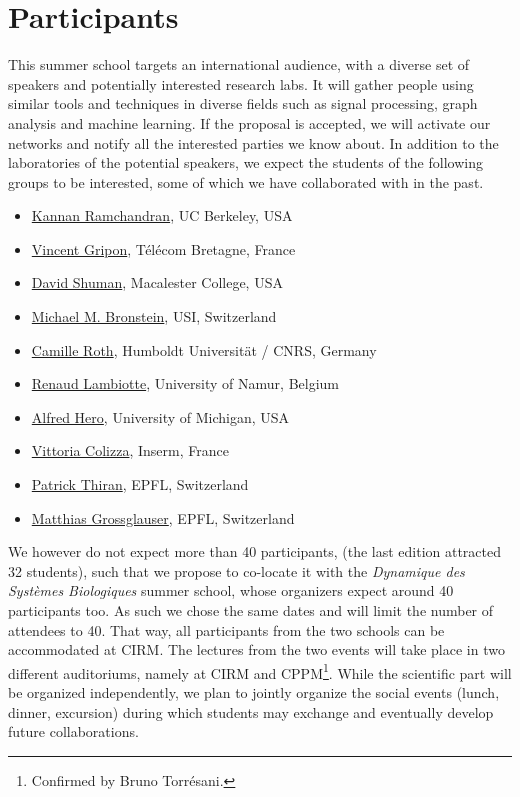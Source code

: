 \documentclass[a4paper]{scrartcl}
\begin{document}
\section{Participants}

This summer school targets an international audience, with a diverse set of
speakers and potentially interested research labs. It will gather people using
similar tools and techniques in diverse fields such as signal processing, graph
analysis and machine learning. If the proposal is accepted, we will activate our
networks and notify all the interested parties we know about. In addition to
the laboratories of the potential speakers, we expect the students of the
following groups to be interested, some of which we have collaborated with in
the past.
\begin{itemize}
	\setlength{\itemsep}{0pt} \setlength{\parskip}{0pt}
	\item \href{http://www.eecs.berkeley.edu/~kannanr/}
		{Kannan Ramchandran}, UC Berkeley, USA
	\item \href{http://www.vincent-gripon.com/}
		{Vincent Gripon}, Télécom Bretagne, France
	\item \href{http://www.macalester.edu/~dshuman1/}
		{David Shuman}, Macalester College, USA
	\item \href{http://www.inf.usi.ch/bronstein/}
		{Michael M. Bronstein}, USI, Switzerland
	\item \href{http://camille.roth.free.fr/index.php}
		{Camille Roth}, Humboldt Universität / CNRS, Germany
	\item \href{http://xn.unamur.be/}
		{Renaud Lambiotte}, University of Namur, Belgium
	\item \href{http://web.eecs.umich.edu/~hero/}
		{Alfred Hero}, University of Michigan, USA
	\item \href{http://www.epicx-lab.com/vittoria-colizza.html}
		{Vittoria Colizza}, Inserm, France
	\item \href{http://people.epfl.ch/patrick.thiran}
		{Patrick Thiran}, EPFL, Switzerland
	\item \href{http://icapeople.epfl.ch/grossglauser/}
		{Matthias Grossglauser}, EPFL, Switzerland
\end{itemize}

We however do not expect more than 40 participants, (the last edition attracted
32 students), such that we propose to co-locate it with the \textit{Dynamique des
Systèmes Biologiques} summer school, whose organizers expect around 40
participants too. As such we chose the same dates and will limit the number of
attendees to 40. That way, all participants from the two schools can be
accommodated at CIRM. The lectures from the two events will take place in two
different auditoriums, namely at CIRM and CPPM\footnote{Confirmed by Bruno
Torrésani.}. While the scientific part will be organized independently, we plan
to jointly organize the social events (lunch, dinner, excursion) during which
students may exchange and eventually develop future collaborations.
\end{document}
